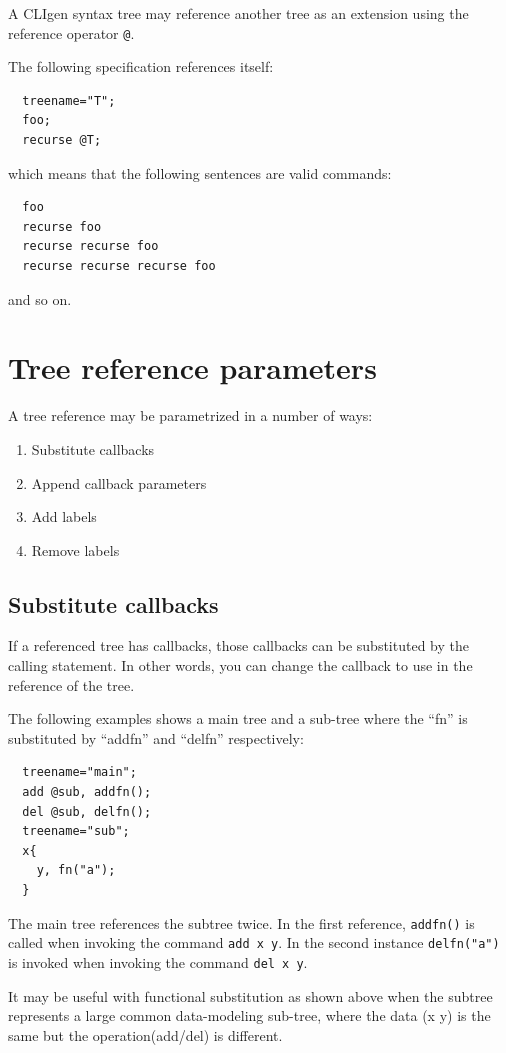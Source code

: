 \documentclass[a4paper, 10pt] {article}
\begin{document}
A CLIgen syntax tree may reference another tree as an extension using
the reference operator {\tt @}.

The following specification references itself:
\begin{verbatim}
  treename="T";
  foo;
  recurse @T;
\end{verbatim}
which means that the following sentences are valid commands:
\begin{verbatim}
  foo
  recurse foo
  recurse recurse foo
  recurse recurse recurse foo
\end{verbatim}
and so on.

\section{Tree reference parameters}

A tree reference may be parametrized in a number of ways:
\begin{enumerate}
\item Substitute callbacks
\item Append callback parameters
\item Add labels
\item Remove labels
\end{enumerate}

\subsection{Substitute callbacks}

If a referenced tree has callbacks, those callbacks can be substituted by the calling statement.
In other words, you can change the callback to use in the reference of the
tree.

The following examples shows a main tree and a sub-tree where the ``fn'' is substituted by ``addfn'' and ``delfn'' respectively:

\begin{verbatim}
  treename="main";
  add @sub, addfn();
  del @sub, delfn();
  treename="sub";
  x{
    y, fn("a");
  }
\end{verbatim}

The main tree references the subtree twice. In the first reference,
{\tt addfn()} is called when invoking the command {\tt add x y}. In the
second instance {\tt delfn("a")} is invoked when invoking the command {\tt del x y}.

It may be useful with functional substitution as shown above when the
subtree represents a large common data-modeling sub-tree, where the
data (x y) is the same but the operation(add/del) is different.
\end{document}
